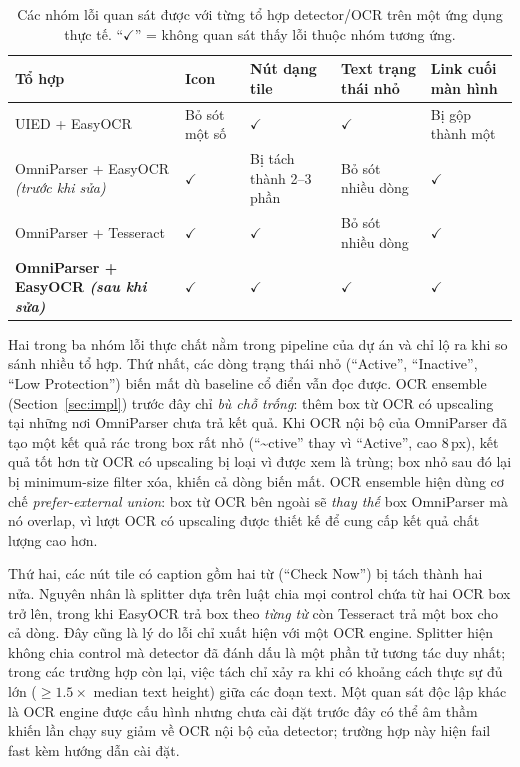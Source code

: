 \documentclass[11pt,a4paper]{article}
\begin{document}
\begin{table}[H]
  \centering\footnotesize
  \caption{Các nhóm lỗi quan sát được với từng tổ hợp detector/OCR trên một ứng
  dụng thực tế. ``$\checkmark$'' = không quan sát thấy lỗi thuộc nhóm tương ứng.}
  \label{tab:combos}
  \begin{tabular}{@{}p{4.5cm}p{2.2cm}p{2.2cm}p{2.4cm}p{2.2cm}@{}}
    \toprule
    Tổ hợp & Icon & Nút dạng tile & Text trạng thái nhỏ & Link cuối màn hình \\
    \midrule
    UIED + EasyOCR & Bỏ sót một số & $\checkmark$ & $\checkmark$ & Bị gộp thành một \\
    OmniParser + EasyOCR \emph{(trước khi sửa)} & $\checkmark$ & Bị tách thành 2--3 phần & Bỏ sót nhiều dòng & $\checkmark$ \\
    OmniParser + Tesseract & $\checkmark$ & $\checkmark$ & Bỏ sót nhiều dòng & $\checkmark$ \\
    \textbf{OmniParser + EasyOCR \emph{(sau khi sửa)}} & $\checkmark$ & $\checkmark$ & $\checkmark$ & $\checkmark$ \\
    \bottomrule
  \end{tabular}
\end{table}

Hai trong ba nhóm lỗi thực chất nằm trong pipeline của dự án và chỉ lộ ra khi so
sánh nhiều tổ hợp. Thứ nhất, các dòng trạng thái nhỏ (``Active'', ``Inactive'',
``Low Protection'') biến mất dù baseline cổ điển vẫn đọc được. OCR ensemble
(Section~\ref{sec:impl}) trước đây chỉ \emph{bù chỗ trống}: thêm box từ OCR có
upscaling tại những nơi OmniParser chưa trả kết quả. Khi OCR nội bộ của OmniParser
đã tạo một kết quả rác trong box rất nhỏ (``\textasciitilde ctive'' thay vì
``Active'', cao 8\,px), kết quả tốt hơn từ OCR có upscaling bị loại vì được xem là
trùng; box nhỏ sau đó lại bị minimum-size filter xóa, khiến cả dòng biến mất. OCR
ensemble hiện dùng cơ chế \emph{prefer-external union}: box từ OCR bên ngoài sẽ
\emph{thay thế} box OmniParser mà nó overlap, vì lượt OCR có upscaling được thiết
kế để cung cấp kết quả chất lượng cao hơn.

Thứ hai, các nút tile có caption gồm hai từ (``Check Now'') bị tách thành hai nửa.
Nguyên nhân là splitter dựa trên luật chia mọi control chứa từ hai OCR box trở lên,
trong khi EasyOCR trả box theo \emph{từng từ} còn Tesseract trả một box cho cả dòng.
Đây cũng là lý do lỗi chỉ xuất hiện với một OCR engine. Splitter hiện không chia
control mà detector đã đánh dấu là một phần tử tương tác duy nhất; trong các trường
hợp còn lại, việc tách chỉ xảy ra khi có khoảng cách thực sự đủ lớn
($\geq 1.5\times$ median text height) giữa các đoạn text. Một quan sát độc lập khác
là OCR engine được cấu hình nhưng chưa cài đặt trước đây có thể âm thầm khiến lần
chạy suy giảm về OCR nội bộ của detector; trường hợp này hiện fail fast kèm hướng
dẫn cài đặt.
\end{document}
